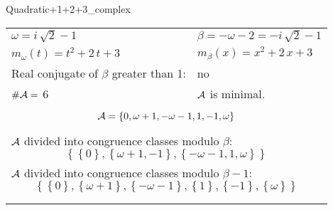 \begin{exmp}
\label{ex:compareAL}

Quadratic+1+2+3\_complex

\rule{0cm}{0cm}

\begin{tabular}{ll}
$\omega=  i \, \sqrt{2} - 1 $  & $\beta= -\omega - 2 = -i \, \sqrt{2} - 1 $\\
$m_\omega(t)=  t^{2} + 2 \, t + 3 $  & $m_\beta(x)=  x^{2} + 2 \, x + 3 $\\
Real conjugate of $\beta$ greater than 1:   &  no \\
$\#\mathcal{A}= $ 6 $ $ & $\mathcal{A}$ is minimal. \\
\multicolumn{2}{l}{\begin{minipage}{\textwidth}\begin{dmath*}\A = \left\{0, \omega + 1, -\omega - 1, 1, -1, \omega\right\}  \end{dmath*}\end{minipage} }\\
\multicolumn{2}{l}{\begin{minipage}{\textwidth}$\mathcal{A}$ divided into congruence classes modulo $\beta$: \begin{dmath*} \left\{\left\{0\right\}, \left\{\omega + 1, -1\right\}, \left\{-\omega - 1, 1, \omega\right\}\right\}  \end{dmath*}\end{minipage} }\\[10pt]
\multicolumn{2}{l}{\begin{minipage}{\textwidth}$\mathcal{A}$ divided into congruence classes modulo $\beta-1$: \begin{dmath*} \left\{\left\{0\right\}, \left\{\omega + 1\right\}, \left\{-\omega - 1\right\}, \left\{1\right\}, \left\{-1\right\}, \left\{\omega\right\}\right\}  \end{dmath*}\end{minipage} }\\
 & \\ \hline
 & \\
\end{tabular}


\end{exmp}
